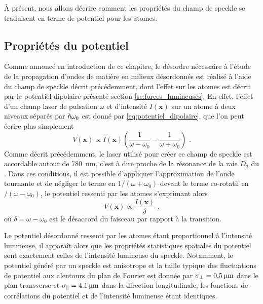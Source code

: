 À présent, nous allons décrire comment les propriétés du champ de speckle se traduisent en terme de potentiel pour les atomes. 

\subsection{Propriétés du potentiel}
\label{sc:propriete_potentiel_speckle}
Comme annoncé en introduction de ce chapitre, le désordre nécessaire à l'étude de la propagation d'ondes de matière en milieux désordonnés est réalisé à l'aide du champ de speckle décrit précédemment, dont l'effet sur les atomes est décrit par le potentiel dipolaire présenté section \ref{sc:forces_lumineuses}. En effet, l'effet d'un champ laser de pulsation $\omega$ et d'intensité $I(\mathbf{x})$ sur un atome à deux niveaux séparés par $\hslash \omega_0$ est donné par \ref{eq:potentiel_dipolaire}, que l'on peut écrire plus simplement 
\begin{equation}
V(\mathbf{x}) \propto I(\mathbf{x}) \left( \frac{1}{\omega-\omega_0} - \frac{1}{\omega+\omega_0} \right) \text{ .}
\end{equation}
Comme décrit précédemment, le laser utilisé pour créer ce champ de speckle est accordable autour de \SI{780}{\nano\metre}, c'est à dire proche de la résonance de la raie $D_2$ du . Dans ces conditions, il est possible d'appliquer l'approximation de l'onde tournante et de négliger le terme en $1/(\omega+\omega_0)$ devant le terme co-rotatif en $/(\omega-\omega_0)$, le potentiel ressenti par les atomes s'exprimant alors
\begin{equation}
V(\mathbf{x}) \propto \frac{I(\mathbf{x})}{\delta} \text{ ,}
\label{eq:potentiel_dipolaire_approx}
\end{equation}
où $\delta=\omega-\omega_0$ est le désaccord du faisceau par rapport à la transition. 

Le potentiel désordonné ressenti par les atomes étant proportionnel à l'intensité lumineuse, il apparaît alors que les propriétés statistiques spatiales du potentiel sont exactement celles de l'intensité lumineuse du speckle. Notamment, le potentiel généré par un speckle est anisotrope et la taille typique des fluctuations de potentiel aux alentours du plan de Fourier est donnée par $\sigma_{\perp}=\SI{0.5}{\micro\metre}$ dans le plan transverse et $\sigma_{\parallel}=\SI{4.1}{\micro\metre}$ dans la direction longitudinale, les fonctions de corrélations du potentiel et de l'intensité lumineuse étant identiques.

